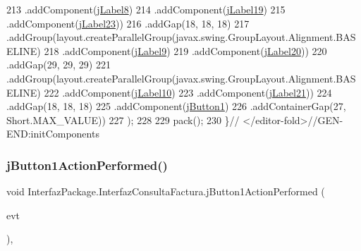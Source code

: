 \begin{DoxyCode}
213                     .addComponent(\mbox{\hyperlink{class_interfaz_package_1_1_interfaz_consulta_factura_af48914b9b888e1bf5f30c0ffc0886c8f}{jLabel8}})
214                     .addComponent(\mbox{\hyperlink{class_interfaz_package_1_1_interfaz_consulta_factura_a901a8d0df72dbe316e6945341e438f52}{jLabel19}})
215                     .addComponent(\mbox{\hyperlink{class_interfaz_package_1_1_interfaz_consulta_factura_a1f75868545728f2ec9d78490ebcb8d39}{jLabel23}}))
216                 .addGap(18, 18, 18)
217                 .addGroup(layout.createParallelGroup(javax.swing.GroupLayout.Alignment.BASELINE)
218                     .addComponent(\mbox{\hyperlink{class_interfaz_package_1_1_interfaz_consulta_factura_a1d3ecb3e98c0cd65e46d2c18f1aa1aef}{jLabel9}})
219                     .addComponent(\mbox{\hyperlink{class_interfaz_package_1_1_interfaz_consulta_factura_a66d5645db5c2843eaf50cd96457bb4b4}{jLabel20}}))
220                 .addGap(29, 29, 29)
221                 .addGroup(layout.createParallelGroup(javax.swing.GroupLayout.Alignment.BASELINE)
222                     .addComponent(\mbox{\hyperlink{class_interfaz_package_1_1_interfaz_consulta_factura_a0461634349aa909bfae6f71cde48237e}{jLabel10}})
223                     .addComponent(\mbox{\hyperlink{class_interfaz_package_1_1_interfaz_consulta_factura_af22e036163f2449a57e02b294812cfc7}{jLabel21}}))
224                 .addGap(18, 18, 18)
225                 .addComponent(\mbox{\hyperlink{class_interfaz_package_1_1_interfaz_consulta_factura_a567e35d7d891c79841a45e5a58b8b917}{jButton1}})
226                 .addContainerGap(27, Short.MAX\_VALUE))
227         );
228 
229         pack();
230     \}\textcolor{comment}{// </editor-fold>//GEN-END:initComponents}
\end{DoxyCode}
\mbox{\label{class_interfaz_package_1_1_interfaz_consulta_factura_a794125608e988abb2f24a5506f65bacc}} 
\subsubsection{\texorpdfstring{j\+Button1\+Action\+Performed()}{jButton1ActionPerformed()}}
{\footnotesize\ttfamily void Interfaz\+Package.\+Interfaz\+Consulta\+Factura.\+j\+Button1\+Action\+Performed (\begin{DoxyParamCaption}\item[{java.\+awt.\+event.\+Action\+Event}]{evt }\end{DoxyParamCaption})\hspace{0.3cm}{\ttfamily [inline]}, {\ttfamily [private]}}


